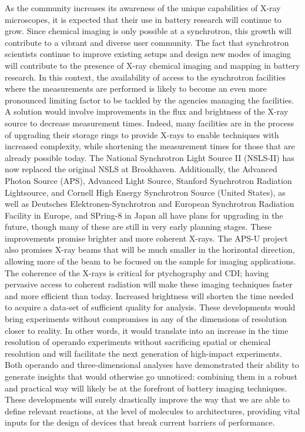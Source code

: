 \documentclass[journal=cmatex,manuscript=perspective]{achemso}
\begin{document}
As the community increases its awareness of the unique capabilities of
X-ray microscopes, it is expected that their use in battery research
will continue to grow. Since chemical imaging is only possible at a
synchrotron, this growth will contribute to a vibrant and diverse user
community. The fact that synchrotron scientists continue to improve
existing setups and design new modes of imaging will contribute to the
presence of X-ray chemical imaging and mapping in battery research. In
this context, the availability of access to the synchrotron facilities
where the measurements are performed is likely to become an even more
pronounced limiting factor to be tackled by the agencies managing the
facilities. A solution would involve improvements in the flux and
brightness of the X-ray source to decrease measurement times. Indeed,
many facilities are in the process of upgrading their storage rings to
provide X-rays to enable techniques with increased complexity, while
shortening the measurement times for those that are already possible
today. The National Synchrotron Light Source II (NSLS-II) has now
replaced the original NSLS at Brookhaven. Additionally, the Advanced
Photon Source (APS), Advanced Light Source, Stanford Synchrotron
Radiation Lightsource, and Cornell High Energy Synchrotron Source
(United States), as well as Deutsches Elektronen-Synchrotron and
European Synchrotron Radiation Facility in Europe, and SPring-8 in
Japan all have plans for upgrading in the future, though many of these
are still in very early planning stages. These improvements promise
brighter and more coherent X-rays. The APS-U project also promises
X-ray beams that will be much smaller in the horizontal direction,
allowing more of the beam to be focused on the sample for imaging
applications. The coherence of the X-rays is critical for ptychography
and CDI; having pervasive access to coherent radiation will make these
imaging techniques faster and more efficient than today. Increased
brightness will shorten the time needed to acquire a data-set of
sufficient quality for analysis. These developments would bring
experiments without compromises in any of the dimensions of resolution
closer to reality. In other words, it would translate into an increase
in the time resolution of operando experiments without sacrificing
spatial or chemical resolution and will facilitate the next generation
of high-impact experiments. Both operando and three-dimensional
analyses have demonstrated their ability to generate insights that
would otherwise go unnoticed: combining them in a robust and practical
way will likely be at the forefront of battery imaging
techniques. These developments will surely drastically improve the way
that we are able to define relevant reactions, at the level of
molecules to architectures, providing vital inputs for the design of
devices that break current barriers of performance.
\end{document}
